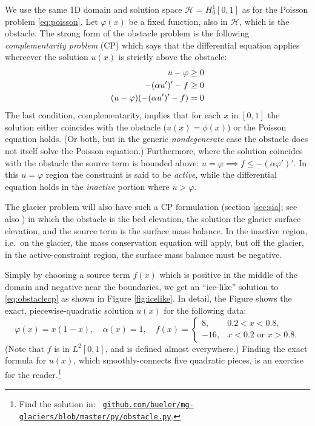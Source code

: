 \documentclass[letterpaper,final,12pt,reqno]{amsart}
\theoremstyle{claim}
\numberwithin{equation}{section}
\numberwithin{figure}{section}
\numberwithin{table}{section}
\numberwithin{theorem}{section}
\begin{document}
We use the same 1D domain and solution space $\mathcal{H}=H_0^1[0,1]$ as for the Poisson problem \eqref{eq:poisson}.  Let $\varphi(x)$ be a fixed function, also in $\mathcal{H}$, which is the obstacle.  The strong form of the obstacle problem is the following \emph{complementarity problem} (CP) \cite{Bueler2021,KinderlehrerStampacchia1980} which says that the differential equation applies whereever the solution $u(x)$ is strictly above the obstacle:
\begin{align}
  u - \varphi &\ge 0 \label{eq:obstaclecp} \\
  -(\alpha u')'-f &\ge 0 \notag \\
  (u-\varphi)(-(\alpha u')'-f) &= 0 \notag
\end{align}
The last condition, complementarity, implies that for each $x$ in $[0,1]$ the solution either coincides with the obstacle ($u(x)=\phi(x)$) or the Poisson equation holds.  (Or both, but in the generic \emph{nondegenerate} \cite{KinderlehrerStampacchia1980} case the obstacle does not itself solve the Poisson equation.)  Furthermore, where the solution coincides with the obstacle the source term is bounded above: $u=\varphi \implies f \le -(\alpha\varphi')'$.  In this $u=\varphi$ region the constraint is said to be \emph{active}, while the differential equation holds in the \emph{inactive} portion where $u>\varphi$.

The glacier problem will also have such a CP formulation (section \ref{sec:sia}; see also \cite{Calvoetal2002}) in which the obstacle is the bed elevation, the solution the glacier surface elevation, and the source term is the surface mass balance.  In the inactive region, i.e.~on the glacier, the mass conservation equation will apply, but off the glacier, in the active-constraint region, the surface mass balance must be negative.

Simply by choosing a source term $f(x)$ which is positive in the middle of the domain and negative near the boundaries, we get an ``ice-like'' solution to \eqref{eq:obstaclecp} as shown in Figure \ref{fig:icelike}.  In detail, the Figure shows the exact, piecewise-quadratic solution $u(x)$ for the following data:
\begin{equation}
\varphi(x) = x(1-x), \quad \alpha(x)=1, \quad f(x) = \begin{cases} 8, & 0.2 < x < 0.8, \\
                                                                 -16, & x<0.2 \text{ or } x>0.8. \end{cases}  \label{eq:icelikedetails}
\end{equation}
(Note that $f$ is in $L^2[0,1]$, and is defined almost everywhere.)  Finding the exact formula for $u(x)$, which smoothly-connects five quadratic pieces, is an exercise for the reader.\footnote{Find the solution in: \, \href{https://github.com/bueler/mg-glaciers/blob/master/py/obstacle.py}{\texttt{github.com/bueler/mg-glaciers/blob/master/py/obstacle.py}}.}
\end{document}
